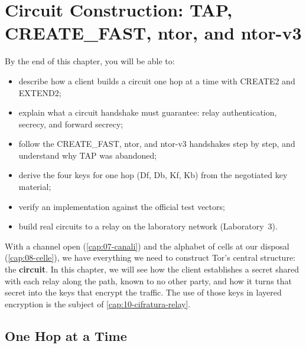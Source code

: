 \chapter{Circuit Construction: TAP, CREATE\_FAST, ntor, and ntor-v3}\label{cap:09-circuiti}

\begin{obiettivi}
By the end of this chapter, you will be able to:
\begin{itemize}[nosep]
  \item describe how a client builds a circuit one hop at a time with CREATE2 and EXTEND2;
  \item explain what a circuit handshake must guarantee: relay authentication, secrecy, and forward secrecy;
  \item follow the CREATE\_FAST, ntor, and ntor-v3 handshakes step by step, and understand why TAP was abandoned;
  \item derive the four keys for one hop (Df, Db, Kf, Kb) from the negotiated key material;
  \item verify an implementation against the official test vectors;
  \item build real circuits to a relay on the laboratory network (Laboratory~3).
\end{itemize}
\end{obiettivi}

With a channel open (\cref{cap:07-canali}) and the alphabet of cells at our disposal (\cref{cap:08-celle}), we have everything we need to construct Tor's central structure: the \textbf{circuit}. In this chapter, we will see how the client establishes a secret shared with each relay along the path, known to no other party, and how it turns that secret into the keys that encrypt the traffic. The use of those keys in layered encryption is the subject of \cref{cap:10-cifratura-relay}.

\section{One Hop at a Time}\label{sec:circ-telescopio}

